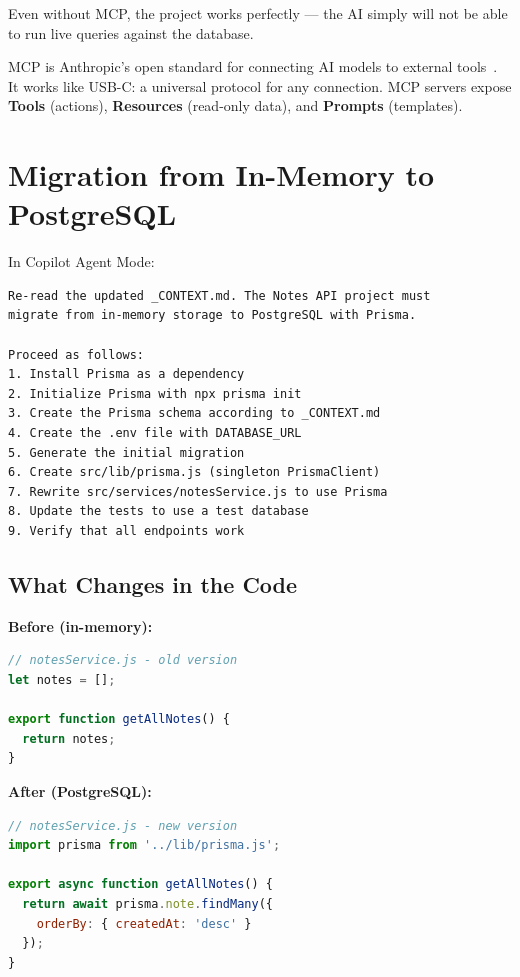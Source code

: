 \begin{tipbox}
Even without MCP, the project works perfectly --- the AI simply will not be able to run live queries against the database.
\end{tipbox}

\begin{notebox}
MCP is Anthropic's open standard for connecting AI models to external tools~\cite{anthropic:mcp,mcp:spec}. It works like USB-C: a universal protocol for any connection. MCP servers expose \textbf{Tools} (actions), \textbf{Resources} (read-only data), and \textbf{Prompts} (templates).
\end{notebox}

\section{Migration from In-Memory to PostgreSQL}

\begin{praticabox}[title={Hands-On --- Prisma installation and migration}]
In Copilot Agent Mode:
\begin{lstlisting}[language={}]
Re-read the updated _CONTEXT.md. The Notes API project must
migrate from in-memory storage to PostgreSQL with Prisma.

Proceed as follows:
1. Install Prisma as a dependency
2. Initialize Prisma with npx prisma init
3. Create the Prisma schema according to _CONTEXT.md
4. Create the .env file with DATABASE_URL
5. Generate the initial migration
6. Create src/lib/prisma.js (singleton PrismaClient)
7. Rewrite src/services/notesService.js to use Prisma
8. Update the tests to use a test database
9. Verify that all endpoints work
\end{lstlisting}
\end{praticabox}

\subsection*{What Changes in the Code}

\textbf{Before (in-memory):}
\begin{lstlisting}[language=JavaScript]
// notesService.js - old version
let notes = [];

export function getAllNotes() {
  return notes;
}
\end{lstlisting}

\textbf{After (PostgreSQL):}
\begin{lstlisting}[language=JavaScript]
// notesService.js - new version
import prisma from '../lib/prisma.js';

export async function getAllNotes() {
  return await prisma.note.findMany({
    orderBy: { createdAt: 'desc' }
  });
}
\end{lstlisting}

